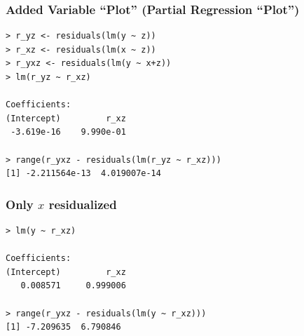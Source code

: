 \documentclass{beamer}
\begin{document}
\begin{frame}[fragile]
\frametitle{Added Variable ``Plot'' (Partial Regression ``Plot'')}

\begin{verbatim}
> r_yz <- residuals(lm(y ~ z))
> r_xz <- residuals(lm(x ~ z))
> r_yxz <- residuals(lm(y ~ x+z))
> lm(r_yz ~ r_xz)

Coefficients:
(Intercept)         r_xz  
 -3.619e-16    9.990e-01  

> range(r_yxz - residuals(lm(r_yz ~ r_xz)))
[1] -2.211564e-13  4.019007e-14
\end{verbatim}

\end{frame}


\begin{frame}[fragile]
\frametitle{Only $x$ residualized}

\begin{verbatim}
> lm(y ~ r_xz)

Coefficients:
(Intercept)         r_xz  
   0.008571     0.999006  

> range(r_yxz - residuals(lm(y ~ r_xz)))
[1] -7.209635  6.790846
\end{verbatim}

\end{frame}



\end{document}
